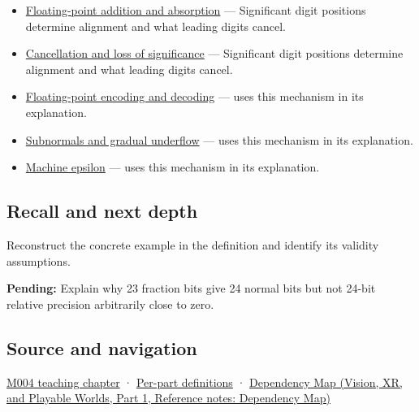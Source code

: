 \hypertarget{appendix-a24fd710cf67-used-by}{}

\begin{itemize}
\item
  \hyperref[appendix-a1b1b4580dfd]{Floating-point addition and absorption} --- Significant digit positions determine alignment and what leading digits cancel.
\item
  \hyperref[appendix-a2773a6a2f9d]{Cancellation and loss of significance} --- Significant digit positions determine alignment and what leading digits cancel.
\item
  \hyperref[appendix-6854d0e2218e]{Floating-point encoding and decoding} --- uses this mechanism in its explanation.
\item
  \hyperref[appendix-00a6e044c437]{Subnormals and gradual underflow} --- uses this mechanism in its explanation.
\item
  \hyperref[appendix-390ea641da54]{Machine epsilon} --- uses this mechanism in its explanation.
\end{itemize}

\subsection{Recall and next depth}\label{appendix-a24fd710cf67-recall-and-next-depth}

\hypertarget{appendix-a24fd710cf67-recall-and-next-depth}{}

Reconstruct the concrete example in the definition and identify its validity assumptions.

\textbf{Pending:} Explain why 23 fraction bits give 24 normal bits but not 24-bit relative precision arbitrarily close to zero.

\subsection{Source and navigation}\label{appendix-a24fd710cf67-source-and-navigation}

\hypertarget{appendix-a24fd710cf67-source-and-navigation}{}

\hyperref[01-foundations-i-ch001-a-stretching-ruler-for-real-valued-quantities]{M004 teaching chapter} · \hyperref[appendix-fd090d982a15-m004---parts-61-76]{Per-part definitions} · \href{../07-Vision-XR-and-Playable-Worlds-P01/main.pdf\#nameddest=appendix-4ad47bdd269a}{Dependency Map (Vision, XR, and Playable Worlds, Part 1, Reference notes: Dependency Map)}
